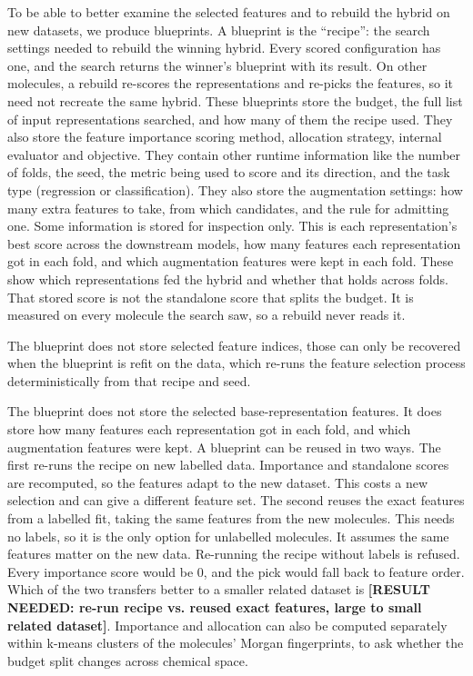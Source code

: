 To be able to better examine the selected features and to rebuild the hybrid on new datasets, we produce blueprints. A blueprint is the ``recipe'': the search settings needed to rebuild the winning hybrid. Every scored configuration has one, and the search returns the winner's blueprint with its result. On other molecules, a rebuild re-scores the representations and re-picks the features, so it need not recreate the same hybrid. These blueprints store the budget, the full list of input representations searched, and how many of them the recipe used. They also store the feature importance scoring method, allocation strategy, internal evaluator and objective. They contain other runtime information like the number of folds, the seed, the metric being used to score and its direction, and the task type (regression or classification). They also store the augmentation settings: how many extra features to take, from which candidates, and the rule for admitting one. Some information is stored for inspection only. This is each representation's best score across the downstream models, how many features each representation got in each fold, and which augmentation features were kept in each fold. These show which representations fed the hybrid and whether that holds across folds. That stored score is not the standalone score that splits the budget. It is measured on every molecule the search saw, so a rebuild never reads it.

The blueprint does not store selected feature indices, those can only be recovered when the blueprint is refit on the data, which re-runs the feature selection process deterministically from that recipe and seed.

The blueprint does not store the selected base-representation features. It does store how many features each representation got in each fold, and which augmentation features were kept. A blueprint can be reused in two ways. The first re-runs the recipe on new labelled data. Importance and standalone scores are recomputed, so the features adapt to the new dataset. This costs a new selection and can give a different feature set. The second reuses the exact features from a labelled fit, taking the same features from the new molecules. This needs no labels, so it is the only option for unlabelled molecules. It assumes the same features matter on the new data. Re-running the recipe without labels is refused. Every importance score would be 0, and the pick would fall back to feature order. Which of the two transfers better to a smaller related dataset is \textbf{[RESULT NEEDED: re-run recipe vs. reused exact features, large to small related dataset]}. Importance and allocation can also be computed separately within k-means clusters of the molecules' Morgan fingerprints, to ask whether the budget split changes across chemical space.

